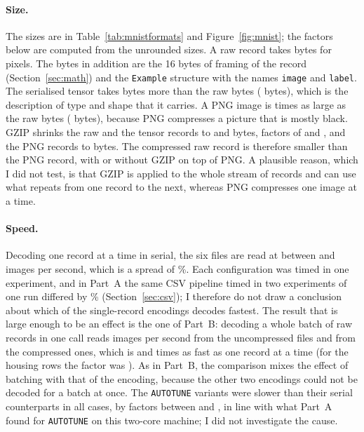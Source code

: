 \paragraph{Size.} The sizes are in Table~\ref{tab:mnistformats} and Figure~\ref{fig:mnist}; the factors below are computed from the unrounded sizes. A raw record takes  bytes for  pixels. The  bytes in addition are the 16 bytes of framing of the record (Section~\ref{sec:math}) and the \texttt{Example} structure with the names \texttt{image} and \texttt{label}. The serialised tensor takes  bytes more than the raw bytes ( bytes), which is the description of type and shape that it carries. A PNG image is  times as large as the raw bytes ( bytes), because PNG compresses a picture that is mostly black. GZIP shrinks the raw and the tensor records to  and  bytes, factors of  and , and the PNG records to  bytes. The compressed raw record is therefore smaller than the PNG record, with or without GZIP on top of PNG. A plausible reason, which I did not test, is that GZIP is applied to the whole stream of records and can use what repeats from one record to the next, whereas PNG compresses one image at a time.

\paragraph{Speed.} Decoding one record at a time in serial, the six files are read at between  and  images per second, which is a spread of \%. Each configuration was timed in one experiment, and in Part~A the same CSV pipeline timed in two experiments of one run differed by \% (Section~\ref{sec:csv}); I therefore do not draw a conclusion about which of the single-record encodings decodes fastest. The result that is large enough to be an effect is the one of Part~B: decoding a whole batch of raw records in one call reads  images per second from the uncompressed files and  from the compressed ones, which is  and  times as fast as one record at a time (for the housing rows the factor was ). As in Part~B, the comparison mixes the effect of batching with that of the encoding, because the other two encodings could not be decoded for a batch at once. The \texttt{AUTOTUNE} variants were slower than their serial counterparts in all  cases, by factors between  and , in line with what Part~A found for \texttt{AUTOTUNE} on this two-core machine; I did not investigate the cause.

